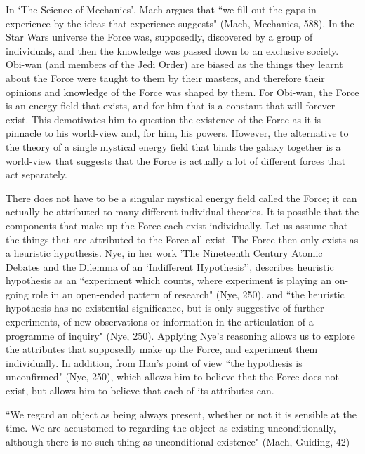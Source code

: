 \documentclass[11pt, oneside]{article}
\begin{document}
\par In `The Science of Mechanics', Mach argues that ``we fill out the gaps in experience by the ideas that experience suggests" (Mach, Mechanics, 588). In the Star Wars universe the Force was, supposedly, discovered by a group of individuals, and then the knowledge was passed down to an exclusive society. Obi-wan (and members of the Jedi Order) are biased as the things they learnt about the Force were taught to them by their masters, and therefore their opinions and knowledge of the Force was shaped by them. For Obi-wan, the Force is an energy field that exists, and for him that is a constant that will forever exist. This demotivates him to question the existence of the Force as it is pinnacle to his world-view and, for him, his powers. However, the alternative to the theory of a single mystical energy field that binds the galaxy together is a world-view that suggests that the Force is actually a lot of different forces that act separately.

\par There does not have to be a singular mystical energy field called the Force; it can actually be attributed to many different individual theories. It is possible that the components that make up the Force each exist individually. Let us assume that the things that are attributed to the Force all exist. The Force then only exists as a heuristic hypothesis. Nye, in her work 'The Nineteenth Century Atomic Debates and the Dilemma of an `Indifferent Hypothesis'', describes heuristic hypothesis as an ``experiment which counts, where experiment is playing an on-going role in an open-ended pattern of research" (Nye, 250), and ``the heuristic hypothesis has no existential significance, but is only suggestive of further experiments, of new observations or information in the articulation of a programme of inquiry" (Nye, 250).   Applying Nye's reasoning allows us to explore the attributes that supposedly make up the Force, and experiment them individually. In addition, from Han's point of view ``the hypothesis is unconfirmed" (Nye, 250), which allows him to believe that the Force does not exist, but allows him to believe that each of its attributes can.

\par ``We regard an object as being always present, whether or not it is sensible at the time. We are accustomed to regarding the object as existing unconditionally, although there is no such thing as unconditional existence" (Mach, Guiding, 42)
\end{document}
